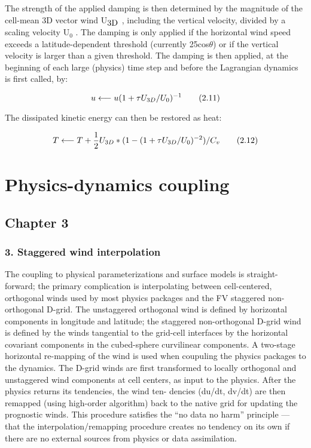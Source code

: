 The strength of the applied damping is then determined by the magnitude of the cell-\/mean 3\-D vector wind U$_{\mbox{3\-D}}$ , including the vertical velocity, divided by a scaling velocity U$_{\mbox{0}}$ . The damping is only applied if the horizontal wind speed exceeds a latitude-\/dependent threshold (currently 25cos{$\theta$}) or if the vertical velocity is larger than a given threshold. The damping is then applied, at the beginning of each large (physics) time step and before the Lagrangian dynamics is first called, by\-:

\[ u \longleftarrow u(1 + \tau U_{3D} / U_0)^{-1} \\ \tag {2.11} \]

The dissipated kinetic energy can then be restored as heat\-:

\[ T \longleftarrow T + \frac{1}{2} U_{3D} * (1 - (1 + \tau U_{3D} / U_0)^{-2}) / C_v \\ \tag {2.12} \] \hypertarget{physics}{}\section{Physics-\/dynamics coupling}\label{physics}
\subsection*{Chapter 3}

\subsubsection*{3. Staggered wind interpolation}

The coupling to physical parameterizations and surface models is straight-\/ forward; the primary complication is interpolating between cell-\/centered, orthogonal winds used by most physics packages and the F\-V staggered non-\/ orthogonal D-\/grid. The unstaggered orthogonal wind is defined by horizontal components in longitude and latitude; the staggered non-\/orthogonal D-\/grid wind is defined by the winds tangential to the grid-\/cell interfaces by the horizontal covariant components in the cubed-\/sphere curvilinear components. A two-\/stage horizontal re-\/mapping of the wind is used when coupuling the physics packages to the dynamics. The D-\/grid winds are first transformed to locally orthogonal and unstaggered wind components at cell centers, as input to the physics. After the physics returns its tendencies, the wind ten-\/ dencies (du/dt, dv/dt) are then remapped (using high-\/order algorithm) back to the native grid for updating the prognostic winds. This procedure satisfies the “no data no harm” principle — that the interpolation/remapping procedure creates no tendency on its own if there are no external sources from physics or data assimilation.


